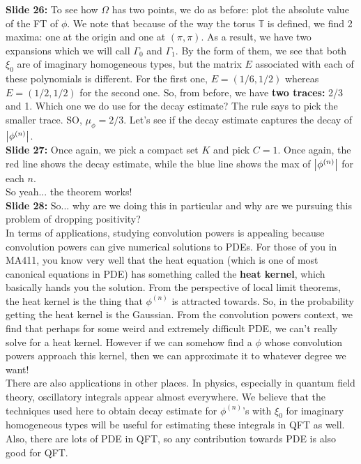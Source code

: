 \documentclass[11pt]{article}
\begin{document}
\noindent \textbf{Slide 26:} To see how $\Omega$ has two points, we do as before: plot the absolute value of the FT of $\phi$. We note that because of the way the torus $\mathbb{T}$ is defined, we find 2 maxima: one at the origin and one at $(\pi,\pi)$. As a result, we have two expansions which we will call $\Gamma_{0}$ and $\Gamma_1$. By the form of them, we see that both $\xi_0$ are of imaginary homogeneous types, but the matrix $E$ associated with each of these polynomials is different. For the first one, $E = (1/6, 1/2)$ whereas $E= (1/2,1/2)$ for the second one. So, from before, we have \textbf{two traces:} 2/3 and 1. Which one we do use for the decay estimate? The rule says to pick the smaller trace. SO, $\mu_\phi = 2/3$. Let's see if the decay estimate captures the decay of $\abs{\phi^{(n)}}$. \\


\noindent \textbf{Slide 27:} Once again, we pick a compact set $K$ and pick $C=1$. Once again, the red line shows the decay estimate, while the blue line shows the max of $\abs{\phi^{(n)}}$ for each $n$. \\

So yeah... the theorem works!\\




\noindent \textbf{Slide 28:} So... why are we doing this in particular and why are we pursuing this problem of dropping positivity? \\


In terms of applications, studying convolution powers is appealing because convolution powers can give numerical solutions to PDEs. For those of you in MA411, you know very well that the heat equation (which is one of most canonical equations in PDE) has something called the \textbf{heat kernel}, which basically hands you the solution. From the perspective of local limit theorems, the heat kernel is the thing that $\phi^{(n)}$ is attracted towards. So, in the probability getting the heat kernel is the Gaussian. From the convolution powers context, we find that perhaps for some weird and extremely difficult PDE, we can't really solve for a heat kernel. However if we can somehow find a $\phi$ whose convolution powers approach this kernel, then we can approximate it to whatever degree we want!\\


There are also applications in other places. In physics, especially in quantum field theory, oscillatory integrals appear almost everywhere. We believe that the techniques used here to obtain decay estimate for $\phi^{(n)}$'s with $\xi_0$ for imaginary homogeneous types will be useful for estimating these integrals in QFT as well. Also, there are lots of PDE in QFT, so any contribution towards PDE is also good for QFT.\\
\end{document}

